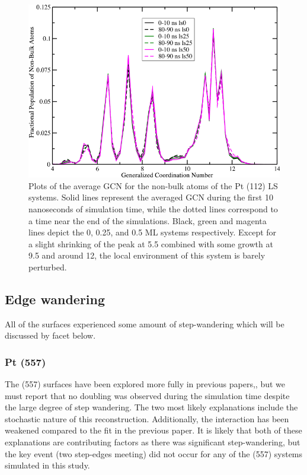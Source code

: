 \begin{figure}[p!]
  \includegraphics[width=\linewidth]{../figures/chap4/112ls_GCNF.pdf}
  \caption{Plots of the average GCN for the non-bulk atoms of the Pt (112) LS
systems. Solid lines represent the averaged GCN during the first 10 nanoseconds
of simulation time, while the dotted lines correspond to a time near the end of
the simulations. Black, green and magenta lines depict the 0, 0.25, and 0.5 ML
systems respectively. Except for a slight shrinking of the peak at 5.5 combined
with some growth at 9.5 and around 12, the local environment of this system is
barely perturbed.}
\label{fig:LS112GCNF}
\end{figure}

\subsection{Edge wandering}
All of the surfaces experienced some amount of step-wandering which will be
discussed by facet below.

\subsubsection{Pt (557)}
The (557) surfaces have been explored more fully in previous
papers,\citep{Tao:2010aa, Michalka:2013aa}, but we must  report that no
doubling was observed during the simulation time despite the large degree of
step wandering. The two most likely explanations include the stochastic nature
of this reconstruction. Additionally, the  interaction has
been weakened compared to the fit in the previous paper.\citep{Michalka:2013aa}
It is likely that both of these explanations are contributing factors as there
was significant step-wandering, but the key event (two step-edges meeting) did
not occur for any of the (557) systems simulated in this study.

